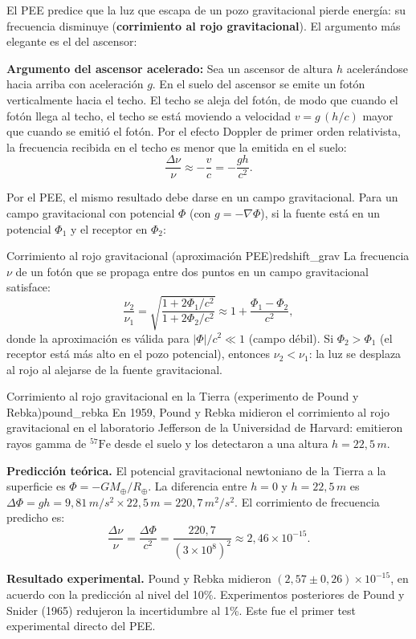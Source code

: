 El PEE predice que la luz que escapa de un pozo gravitacional pierde energía: su frecuencia disminuye (\textbf{corrimiento al rojo gravitacional}). El argumento más elegante es el del ascensor:

\textbf{Argumento del ascensor acelerado:} Sea un ascensor de altura $h$ acelerándose hacia arriba con aceleración $g$. En el suelo del ascensor se emite un fotón verticalmente hacia el techo. El techo se aleja del fotón, de modo que cuando el fotón llega al techo, el techo se está moviendo a velocidad $v = g\,(h/c)$ mayor que cuando se emitió el fotón. Por el efecto Doppler de primer orden relativista, la frecuencia recibida en el techo es menor que la emitida en el suelo:
\begin{equation}
  \frac{\Delta\nu}{\nu} \approx -\frac{v}{c} = -\frac{gh}{c^2}.
  \label{eq:redshift_grav_ascensor}
\end{equation}

Por el PEE, el mismo resultado debe darse en un campo gravitacional. Para un campo gravitacional con potencial $\Phi$ (con $g = -\nabla\Phi$), si la fuente está en un potencial $\Phi_1$ y el receptor en $\Phi_2$:

\begin{teorema}{Corrimiento al rojo gravitacional (aproximación PEE)}{redshift_grav}
La frecuencia $\nu$ de un fotón que se propaga entre dos puntos en un campo gravitacional satisface:
\begin{equation}
  \frac{\nu_2}{\nu_1} = \sqrt{\frac{1 + 2\Phi_1/c^2}{1 + 2\Phi_2/c^2}}
  \approx 1 + \frac{\Phi_1 - \Phi_2}{c^2},
  \label{eq:redshift_grav}
\end{equation}
donde la aproximación es válida para $|\Phi|/c^2 \ll 1$ (campo débil). Si $\Phi_2 > \Phi_1$ (el receptor está más alto en el pozo potencial), entonces $\nu_2 < \nu_1$: la luz se desplaza al rojo al alejarse de la fuente gravitacional.
\end{teorema}

\begin{ejemplo}{Corrimiento al rojo gravitacional en la Tierra (experimento de Pound y Rebka)}{pound_rebka}
En 1959, Pound y Rebka midieron el corrimiento al rojo gravitacional en el laboratorio Jefferson de la Universidad de Harvard: emitieron rayos gamma de ${}^{57}\text{Fe}$ desde el suelo y los detectaron a una altura $h = 22{,}5\,\si{m}$.

\textbf{Predicción teórica.} El potencial gravitacional newtoniano de la Tierra a la superficie es $\Phi = -GM_\oplus/R_\oplus$. La diferencia entre $h = 0$ y $h = 22{,}5\,\si{m}$ es $\Delta\Phi = gh = 9{,}81\,\si{m/s^2}\times 22{,}5\,\si{m} = 220{,}7\,\si{m^2/s^2}$. El corrimiento de frecuencia predicho es:
\[
  \frac{\Delta\nu}{\nu} = \frac{\Delta\Phi}{c^2} = \frac{220{,}7}{(3\times10^8)^2}
  \approx 2{,}46\times10^{-15}.
\]

\textbf{Resultado experimental.} Pound y Rebka midieron $(2{,}57 \pm 0{,}26)\times10^{-15}$, en acuerdo con la predicción al nivel del 10\%. Experimentos posteriores de Pound y Snider (1965) redujeron la incertidumbre al 1\%. Este fue el primer test experimental directo del PEE.
\end{ejemplo}

